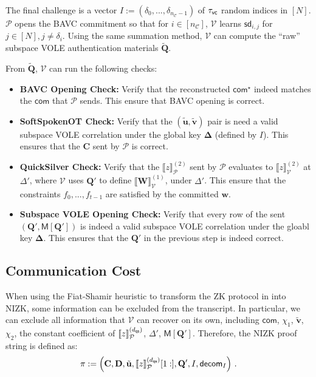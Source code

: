 \documentclass[11pt,a4paper]{article}
\theoremstyle{definition}
\theoremstyle{remark}
\newcommand{\calC}{\mathcal{C}}
\newcommand{\itmacP}[1]{\llbracket {#1} \rrbracket_{\calP}}
\newcommand{\itmacV}[1]{\llbracket {#1} \rrbracket_{\calV}}
\newcommand{\calP}{\mathcal{P}}
\newcommand{\calV}{\mathcal{V}}
\newcommand{\mat}[1]{\mathbf{#1}}
\renewcommand{\vec}[1]{\mathbf{#1}}
\begin{document}
\begin{description}[leftmargin=0.9em, labelsep=0.5em]
	\item[BAVC opening and verification.]
		The final challenge is a vector $I := (\delta_0, ..., \delta_{n_{\calC} - 1})$
		of $\tau_{\sf vc}$ random indices in $[N]$. 
		$\calP$ opens the BAVC commitment so that for $i \in [n_{\calC}]$, 
		$\calV$ learns $\mathsf{sd}_{i, j}$ for $j \in [N], j \neq \delta_{i}$.
		Using the same summation method, $\calV$ can compute the ``raw'' subspace VOLE 
		authentication materials $\widetilde{\mat{Q}}$.
\end{description}

From $\widetilde{\mat{Q}}$, $\calV$ can run the following checks:
\begin{itemize}
	\item \textbf{BAVC Opening Check:} Verify that the reconstructed $\mathsf{com}^{\star}$
	indeed matches the $\mathsf{com}$ that $\calP$ sends. This ensure that BAVC opening is 
	correct. 
	
	\item \textbf{SoftSpokenOT Check: } Verify that the $(\tilde{\vec{u}}, \tilde{\vec{v}})$ pair 
	is need a valid subspace VOLE correlation under the global key $\mat{\Delta}$ (defined by $I$).
	This ensures that the $\mat{C}$ sent by $\calP$ is correct. 

	\item \textbf{QuickSilver Check:} Verify that the $\itmacP{z}^{(2)}$ sent by $\calP$ evaluates 
	to $\itmacV{z}^{(2)}$ at $\Delta'$, where $\calV$ uses $\mat{Q}'$ to define 
	$\itmacV{\mat{W}}^{(1)}$, under $\Delta'$. 
	This ensure that the constraints $f_0, ..., f_{t-1}$ are satisfied 
	by the committed $\vec{w}$.

	\item \textbf{Subspace VOLE Opening Check:} Verify that every row of the sent 
	$(\mat{Q}', \mathsf{M}[\mat{Q}'])$ is indeed a valid subspace VOLE correlation 
	under the gloabl key $\mat{\Delta}$. This ensures that the $\mat{Q}'$ in the previous 
	step is indeed correct.
\end{itemize}

\subsection{Communication Cost}

When using the Fiat-Shamir heuristic to transform 
the ZK protocol in 
into NIZK, some information can be excluded from the transcript.
In particular, we can exclude all information that $\calV$ can recover 
on its own, including $\mathsf{com}$, $\chi_1$, $\tilde{\vec{v}}$, 
$\chi_2$, the constant coefficient of $\itmacP{z}^{(d_{\sf qs})}$,
$\Delta'$, $\mathsf{M}[\mat{Q}']$.
Therefore, the NIZK proof string is defined as:
\begin{equation}
	\pi := 
	\left(
	\mat{C},
	\mat{D},
	\tilde{\vec{u}},
	\itmacP{z}^{(d_{\sf qs})}[1:],
	\mat{Q}',
	I, 
	\mathsf{decom}_{I}
	\right) \,.
\end{equation}
\end{document}
